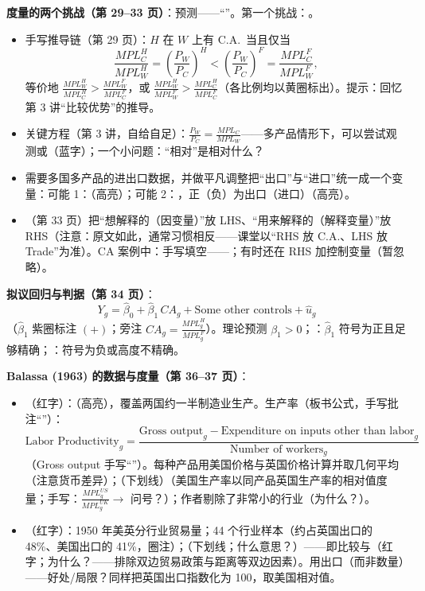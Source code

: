 \textbf{度量的两个挑战（第 29--33 页）}：预测——``''。第一个挑战：。
\begin{itemize}
  \item {}手写推导链（第 29 页）：$H$ 在 $W$ 上有 C.A.\ 当且仅当
  \[
  \frac{MPL_C^H}{MPL_W^H} = \left( \frac{P_W}{P_C} \right)^H < \left( \frac{P_W}{P_C} \right)^F = \frac{MPL_C^F}{MPL_W^F},
  \]
  等价地 $\frac{MPL_W^H}{MPL_C^H} > \frac{MPL_W^F}{MPL_C^F}$，或 $\frac{MPL_W^H}{MPL_W^F} > \frac{MPL_C^H}{MPL_C^F}$（各比例均以黄圈标出）。提示：回忆第 3 讲``比较优势''的推导。
  \item 关键方程（第 3 讲，自给自足）：$\frac{P_W}{P_C} = \frac{MPL_C}{MPL_W}$——多产品情形下，可以尝试观测或（蓝字）；一个小问题：``相对''是相对什么？
  \item {}需要多国多产品的进出口数据，并做平凡调整把``出口''与``进口''统一成一个变量：可能 1：（高亮）；可能 2：，正（负）为出口（进口）（高亮）。
  \item {}（第 33 页）把``想解释的（因变量）''放 LHS、``用来解释的（解释变量）''放 RHS（注意：原文如此，通常习惯相反——课堂以``RHS 放 C.A.、LHS 放 Trade''为准）。CA 案例中：手写填空——；有时还在 RHS 加控制变量（暂忽略）。
\end{itemize}

\textbf{拟议回归与判据（第 34 页）}：
\[
Y_g = \hat\beta_0 + \hat\beta_1\, CA_g + \text{Some other controls} + \hat u_g
\]
（$\hat\beta_1$ 紫圈标注 $(+)$；旁注 $CA_g = \frac{MPL_g^H}{MPL_g^F}$）。理论预测 $\beta_1 > 0$；：$\hat\beta_1$ 符号为正且足够精确；：符号为负或高度不精确。

\textbf{Balassa (1963) 的数据与度量（第 36--37 页）}：
\begin{itemize}
  \item {}（红字）：（高亮），覆盖两国约一半制造业生产。生产率（板书公式，手写批注``''）：
  \[
  \text{Labor Productivity}_g = \frac{\text{Gross output}_g - \text{Expenditure on inputs other than labor}_g}{\text{Number of workers}_g}
  \]
  （Gross output 手写``''）。每种产品用美国价格与英国价格计算并取几何平均（注意货币差异）；（下划线）（美国生产率以同产品英国生产率的相对值度量；手写：$\frac{MPL_g^{US}}{MPL_g^{UK}} \to$ 问号？）；作者剔除了非常小的行业（为什么？）。
  \item {}（红字）：1950 年美英分行业贸易量；44 个行业样本（约占英国出口的 48\%、美国出口的 41\%，圈注）；（下划线；什么意思？）——即比较与（红字；为什么？——排除双边贸易政策与距离等双边因素）。用出口（而非数量）——好处/局限？同样把英国出口指数化为 100，取美国相对值。
\end{itemize}

